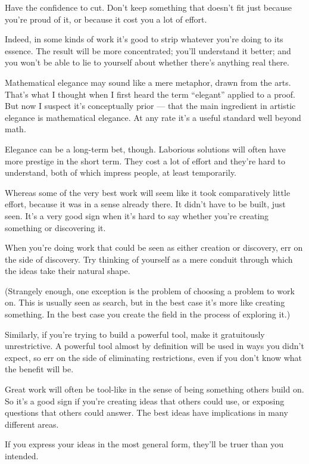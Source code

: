 \documentclass[12pt]{book}
\begin{document}
Have the confidence to cut. Don't keep something that doesn't fit just
because you're proud of it, or because it cost you a lot of effort.

Indeed, in some kinds of work it's good to strip whatever you're doing
to its essence. The result will be more concentrated; you'll understand
it better; and you won't be able to lie to yourself about whether
there's anything real there.

Mathematical elegance may sound like a mere metaphor, drawn from the
arts. That's what I thought when I first heard the term ``elegant''
applied to a proof. But now I suspect it's conceptually prior --- that
the main ingredient in artistic elegance is mathematical elegance. At
any rate it's a useful standard well beyond math.

Elegance can be a long-term bet, though. Laborious solutions will often
have more prestige in the short term. They cost a lot of effort and
they're hard to understand, both of which impress people, at least
temporarily.

Whereas some of the very best work will seem like it took comparatively
little effort, because it was in a sense already there. It didn't have
to be built, just seen. It's a very good sign when it's hard to say
whether you're creating something or discovering it.

When you're doing work that could be seen as either creation or
discovery, err on the side of discovery. Try thinking of yourself as a
mere conduit through which the ideas take their natural shape.

(Strangely enough, one exception is the problem of choosing a problem to
work on. This is usually seen as search, but in the best case it's more
like creating something. In the best case you create the field in the
process of exploring it.)

Similarly, if you're trying to build a powerful tool, make it
gratuitously unrestrictive. A powerful tool almost by definition will be
used in ways you didn't expect, so err on the side of eliminating
restrictions, even if you don't know what the benefit will be.

Great work will often be tool-like in the sense of being something
others build on. So it's a good sign if you're creating ideas that
others could use, or exposing questions that others could answer. The
best ideas have implications in many different areas.

If you express your ideas in the most general form, they'll be truer
than you intended.
\end{document}
